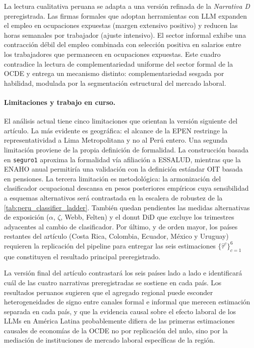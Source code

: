 La lectura cualitativa peruana se adapta a una versi\'{o}n refinada de la \emph{Narrativa D} preregistrada. Las firmas formales que adoptan herramientas con LLM expanden el empleo en ocupaciones expuestas (margen extensivo positivo) y reducen las horas semanales por trabajador (ajuste intensivo). El sector informal exhibe una contracci\'{o}n d\'{e}bil del empleo combinada con selecci\'{o}n positiva en salarios entre los trabajadores que permanecen en ocupaciones expuestas. Este cuadro contradice la lectura de complementariedad uniforme del sector formal de la OCDE y entrega un mecanismo distinto: complementariedad sesgada por habilidad, modulada por la segmentaci\'{o}n estructural del mercado laboral.

\paragraph{Limitaciones y trabajo en curso.} El an\'{a}lisis actual tiene cinco limitaciones que orientan la versi\'{o}n siguiente del art\'{i}culo. La m\'{a}s evidente es geogr\'{a}fica: el alcance de la EPEN restringe la representatividad a Lima Metropolitana y no al Per\'{u} entero. Una segunda limitaci\'{o}n proviene de la propia definici\'{o}n de formalidad. La construcci\'{o}n basada en \texttt{seguro1} aproxima la formalidad v\'{i}a afiliaci\'{o}n a ESSALUD, mientras que la ENAHO anual permitir\'{i}a una validaci\'{o}n con la definici\'{o}n est\'{a}ndar OIT basada en pensiones. La tercera limitaci\'{o}n es metodol\'{o}gica: la armonizaci\'{o}n del clasificador ocupacional descansa en pesos posteriores emp\'{i}ricos cuya sensibilidad a esquemas alternativos ser\'{a} contrastada en la escalera de robustez de la \cref{tab:peru_classifier_ladder}. Tambi\'{e}n quedan pendientes las medidas alternativas de exposici\'{o}n ($\alpha$, $\zeta$, Webb, Felten) y el donut DiD que excluye los trimestres adyacentes al cambio de clasificador. Por \'{u}ltimo, y de orden mayor, los pa\'{i}ses restantes del art\'{i}culo (Costa Rica, Colombia, Ecuador, M\'{e}xico y Uruguay) requieren la replicaci\'{o}n del pipeline para entregar las seis estimaciones $\{\hat\tau^c\}_{c=1}^6$ que constituyen el resultado principal preregistrado.

La versi\'{o}n final del art\'{i}culo contrastar\'{a} los seis pa\'{i}ses lado a lado e identificar\'{a} cu\'{a}l de las cuatro narrativas preregistradas se sostiene en cada pa\'{i}s. Los resultados peruanos sugieren que el agregado regional puede esconder heterogeneidades de signo entre canales formal e informal que merecen estimaci\'{o}n separada en cada pa\'{i}s, y que la evidencia causal sobre el efecto laboral de los LLMs en Am\'{e}rica Latina probablemente difiera de las primeras estimaciones causales de econom\'{i}as de la OCDE no por replicaci\'{o}n del nulo, sino por la mediaci\'{o}n de instituciones de mercado laboral espec\'{i}ficas de la regi\'{o}n.
